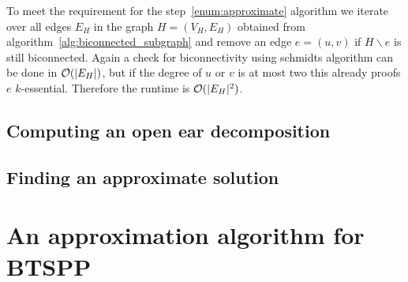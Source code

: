 To meet the requirement for the step~\ref{enum:approximate} algorithm we iterate over all edges \(E_H\) in the graph \(H = (V_H, E_H)\) obtained from algorithm~\ref{alg:biconnected_subgraph} and remove an edge \(e = (u, v)\) if \(H \backslash e\) is still biconnected. Again a check for biconnectivity using schmidts algorithm can be done in \(\mathcal{O}(\vert E_H \vert)\), but if the degree of \(u\) or \(v\) is at most two this already proofs \(e\) \(k\)-essential. Therefore the runtime is \(\mathcal{O}(\vert {E_H} \vert^2)\).

\subsection{Computing an open ear decomposition}
\subsection{Finding an approximate solution}

\section{An approximation algorithm for BTSPP}